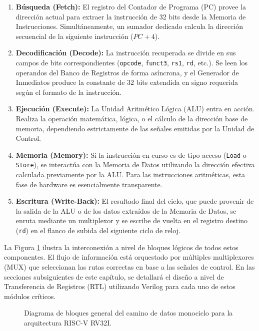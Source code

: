\begin{enumerate}
    \item \textbf{Búsqueda (Fetch):} El registro del Contador de Programa (PC) provee la dirección actual para extraer la instrucción de 32 bits desde la Memoria de Instrucciones. Simultáneamente, un sumador dedicado calcula la dirección secuencial de la siguiente instrucción ($PC + 4$).
    \item \textbf{Decodificación (Decode):} La instrucción recuperada se divide en sus campos de bits correspondientes (\texttt{opcode}, \texttt{funct3}, \texttt{rs1}, \texttt{rd}, etc.). Se leen los operandos del Banco de Registros de forma asíncrona, y el Generador de Inmediatos produce la constante de 32 bits extendida en signo requerida según el formato de la instrucción.
    \item \textbf{Ejecución (Execute):} La Unidad Aritmético Lógica (ALU) entra en acción. Realiza la operación matemática, lógica, o el cálculo de la dirección base de memoria, dependiendo estrictamente de las señales emitidas por la Unidad de Control.
    \item \textbf{Memoria (Memory):} Si la instrucción en curso es de tipo acceso (\texttt{Load} o \texttt{Store}), se interactúa con la Memoria de Datos utilizando la dirección efectiva calculada previamente por la ALU. Para las instrucciones aritméticas, esta fase de hardware es esencialmente transparente.
    \item \textbf{Escritura (Write-Back):} El resultado final del ciclo, que puede provenir de la salida de la ALU o de los datos extraídos de la Memoria de Datos, se enruta mediante un multiplexor y se escribe de vuelta en el registro destino (\texttt{rd}) en el flanco de subida del siguiente ciclo de reloj.
\end{enumerate}



La Figura \ref{fig:datapath_monociclo} ilustra la interconexión a nivel de bloques lógicos de todos estos componentes. El flujo de información está orquestado por múltiples multiplexores (MUX) que seleccionan las rutas correctas en base a las señales de control. En las secciones subsiguientes de este capítulo, se detallará el diseño a nivel de Transferencia de Registros (RTL) utilizando Verilog para cada uno de estos módulos críticos.

\begin{figure}[h!]
    \centering
    \caption{Diagrama de bloques general del camino de datos monociclo para la arquitectura RISC-V RV32I.}
    \label{fig:datapath_monociclo}
\end{figure}




